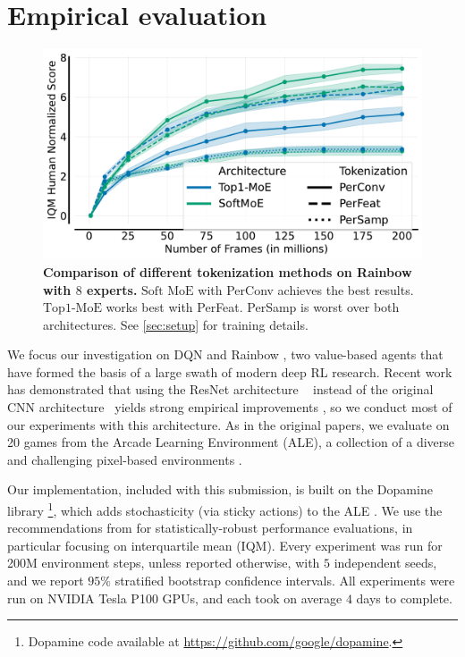 \documentclass{article}
\theoremstyle{plain}
\theoremstyle{definition}
\theoremstyle{remark}
\newcommand{\moe}{$\textrm{Top1-MoE}$}
\newcommand{\softmoe}{$\textrm{Soft MoE}$}
\begin{document}
\section{Empirical evaluation}
\label{sec:empiricalResults}

\begin{figure}[!t]
    \centering
    \includegraphics[width=\linewidth]{figures/rainbowTokenization.pdf}
    \vspace{-0.4cm}
    \caption{{\bf Comparison of different tokenization methods on Rainbow with $8$ experts.} \softmoe{} with PerConv achieves the best results. \moe{} works best with PerFeat. PerSamp is worst over both architectures. See \cref{sec:setup} for training details.}
    \label{fig:rainbowTokenization}%
\end{figure}

\label{sec:setup}
We focus our investigation on DQN \citep{mnih2015humanlevel} and Rainbow \citep{Hessel2018RainbowCI}, two value-based agents that have formed the basis of a large swath of modern deep RL research. Recent work has demonstrated that using the ResNet architecture ~\citep{espeholt2018impala} instead of the original CNN architecture~\citep{mnih2015humanlevel}  yields strong empirical improvements \citep{graesser2022state,schwarzer23bbf}, so we conduct most of our experiments with this architecture. As in the original papers, we evaluate on 20 games from the Arcade Learning Environment (ALE), a collection of a diverse and challenging pixel-based environments \citep{bellemare2012ale}.

Our implementation, included with this submission, is built on the Dopamine library \citep{castro18dopamine}\footnote{Dopamine code available at  \url{https://github.com/google/dopamine}.}, which adds stochasticity (via sticky actions) to the ALE \citep{machado18revisiting}. We use the recommendations from \citet{agarwal2021deep} for statistically-robust performance evaluations, in particular focusing on interquartile mean (IQM). Every experiment was run for 200M environment steps, unless reported otherwise, with $5$ independent seeds, and we report $95\%$ stratified bootstrap confidence intervals. All experiments were run on NVIDIA Tesla P100 GPUs, and each took on average $4$ days to complete.
\end{document}
